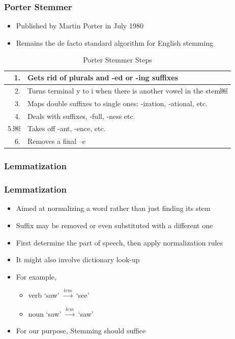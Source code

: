 \documentclass{beamer}
\begin{document}
\begin{frame}
\frametitle{Porter Stemmer}

\begin{itemize}
\item Published by Martin Porter in July 1980
\item Remains the de facto standard algorithm for English stemming

\end{itemize}

\begin{table}[h]
\begin{tabular}{|r|l|} \hline
1.	&	Gets rid of plurals and -ed or -ing suffixes \\ \hline
2.	&	Turns terminal y to i when there is another vowel in the stem￼ \\ \hline
3.	&	Maps double suffixes to single ones: -ization, -ational, etc. \\ \hline
4.	&	Deals with suffixes, -full, -ness etc. \\ \hline
5.￼	&	Takes off -ant, -ence, etc. \\ \hline
6.	&	Removes a final –e \\ \hline
\end{tabular}
\caption{Porter Stemmer Steps}
\label{tab:porter}
\end{table}

\end{frame}

\subsubsection{Lemmatization}

\begin{frame}
\frametitle{Lemmatization}
\begin{itemize}
\item Aimed at normalizing a word rather than just finding its stem
\item Suffix may be removed or even substituted with a different one
\item First determine the part of speech, then apply normalization rules
\item It might also involve dictionary look-up
\item For example,
	\begin{itemize}
	\item verb `saw' $\xrightarrow{lem}$ `see'
	\item noun `saw' $\xrightarrow{lem}$ `saw'
	\end{itemize}
\item For our purpose, Stemming should suffice
\end{itemize}
\end{frame}
\end{document}
